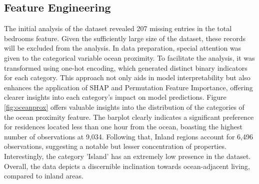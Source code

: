 \documentclass[12pt]{article}
\begin{document}
\subsection{Feature Engineering}
The initial analysis of the dataset revealed 207 missing entries in the total bedrooms feature. Given the sufficiently large size of the dataset, these records will be excluded from the analysis. In data preparation, special attention was given to the categorical variable ocean proximity. To facilitate the analysis, it was transformed using one-hot encoding, which generated distinct binary indicators for each category. This approach not only aids in model interpretability but also enhances the application of SHAP and Permutation Feature Importance, offering clearer insights into each category’s impact on model predictions.
Figure \ref{fig:oceanprox} offers valuable insights into the distribution of the categories of the ocean proximity feature.
The barplot clearly indicates a significant preference for residences located less than one hour from the ocean, boasting the highest number of observations at 9,034. Following that, Inland regions account for 6,496 observations, suggesting a notable but lesser concentration of properties. Interestingly, the category 'Island' has an extremely low presence in the dataset. Overall, the data depicts a discernible inclination towards ocean-adjacent living, compared to inland areas.
\end{document}
